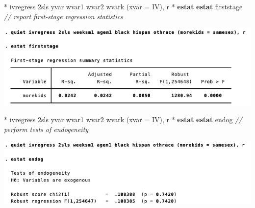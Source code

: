 \documentclass[
  10pt,
  ignorenonframetext,
]{beamer}
\newenvironment{Shaded}{\begin{snugshade}}{\end{snugshade}}
\newcommand{\CommentTok}[1]{\textcolor[rgb]{0.56,0.35,0.01}{\textit{#1}}}
\newcommand{\FunctionTok}[1]{\textcolor[rgb]{0.00,0.00,0.00}{#1}}
\newcommand{\KeywordTok}[1]{\textcolor[rgb]{0.13,0.29,0.53}{\textbf{#1}}}
\newcommand{\NormalTok}[1]{#1}
\begin{document}
\begin{frame}[fragile]{}
\protect\hypertarget{section-4}{}
\small

\begin{Shaded}
\begin{Highlighting}[]
\NormalTok{* ivregress 2sls yvar wvar1 wvar2 wvark (xvar = IV), }\FunctionTok{r}
\NormalTok{* }\KeywordTok{estat} \KeywordTok{estat}\NormalTok{ firststage}
\CommentTok{// report first{-}stage regression statistics}
\end{Highlighting}
\end{Shaded}

\begin{center}\includegraphics[width=1\linewidth]{pictures/res7-estatFirstStage2SLS} \end{center}
\end{frame}

\begin{frame}[fragile]{}
\protect\hypertarget{section-5}{}
\small

\begin{Shaded}
\begin{Highlighting}[]
\NormalTok{* ivregress 2sls yvar wvar1 wvar2 wvark (xvar = IV), }\FunctionTok{r}
\NormalTok{* }\KeywordTok{estat} \KeywordTok{estat}\NormalTok{ endog}
\CommentTok{// perform tests of endogeneity}
\end{Highlighting}
\end{Shaded}

\begin{center}\includegraphics[width=1\linewidth]{pictures/res8-estatEndog2SLS} \end{center}
\end{frame}
\end{document}
